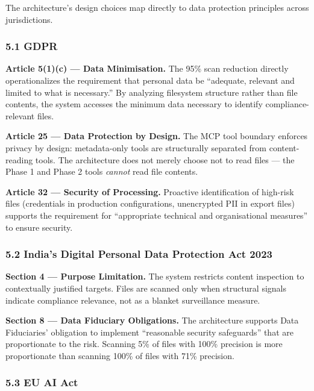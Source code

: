 \documentclass[
]{article}
\begin{document}
The architecture's design choices map directly to data protection
principles across jurisdictions.

\subsubsection{5.1 GDPR}\label{gdpr}

\textbf{Article 5(1)(c) --- Data Minimisation.} The 95\% scan reduction
directly operationalizes the requirement that personal data be
``adequate, relevant and limited to what is necessary.'' By analyzing
filesystem structure rather than file contents, the system accesses the
minimum data necessary to identify compliance-relevant files.

\textbf{Article 25 --- Data Protection by Design.} The MCP tool boundary
enforces privacy by design: metadata-only tools are structurally
separated from content-reading tools. The architecture does not merely
choose not to read files --- the Phase 1 and Phase 2 tools \emph{cannot}
read file contents.

\textbf{Article 32 --- Security of Processing.} Proactive identification
of high-risk files (credentials in production configurations,
unencrypted PII in export files) supports the requirement for
``appropriate technical and organisational measures'' to ensure
security.

\subsubsection{5.2 India's Digital Personal Data Protection Act
2023}\label{indias-digital-personal-data-protection-act-2023}

\textbf{Section 4 --- Purpose Limitation.} The system restricts content
inspection to contextually justified targets. Files are scanned only
when structural signals indicate compliance relevance, not as a blanket
surveillance measure.

\textbf{Section 8 --- Data Fiduciary Obligations.} The architecture
supports Data Fiduciaries' obligation to implement ``reasonable security
safeguards'' that are proportionate to the risk. Scanning 5\% of files
with 100\% precision is more proportionate than scanning 100\% of files
with 71\% precision.

\subsubsection{5.3 EU AI Act}\label{eu-ai-act}
\end{document}

